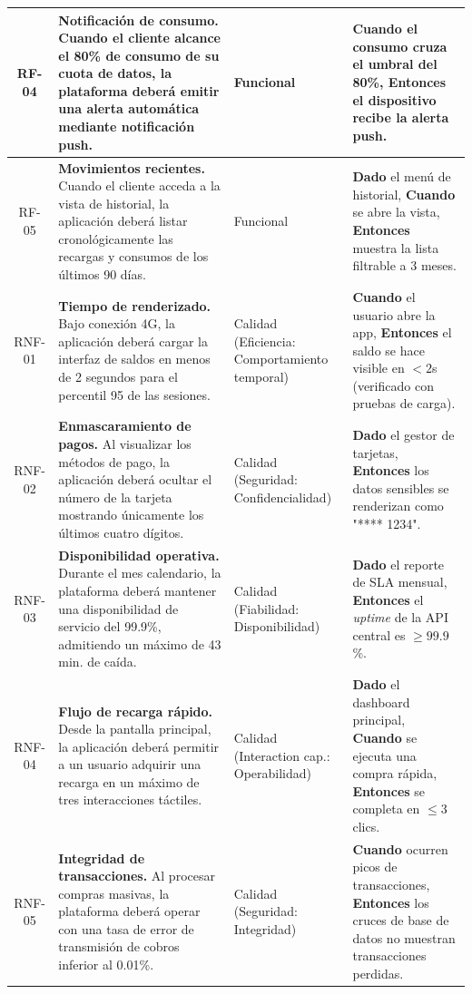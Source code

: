 \documentclass[12pt,a4paper]{article}
\begin{document}
\begin{xltabular}{\textwidth}{|c|>{\raggedright\arraybackslash}X|>{\raggedright\arraybackslash}p{3.2cm}|>{\raggedright\arraybackslash}X|}
RF-04 & \textbf{Notificación de consumo.} Cuando el cliente alcance el 80\% de consumo de su cuota de datos, la plataforma deberá emitir una alerta automática mediante notificación push. & Funcional & \textbf{Cuando} el consumo cruza el umbral del 80\%, \textbf{Entonces} el dispositivo recibe la alerta push. \\ \hline

RF-05 & \textbf{Movimientos recientes.} Cuando el cliente acceda a la vista de historial, la aplicación deberá listar cronológicamente las recargas y consumos de los últimos 90 días. & Funcional & \textbf{Dado} el menú de historial, \textbf{Cuando} se abre la vista, \textbf{Entonces} muestra la lista filtrable a 3 meses. \\ \hline

RNF-01 & \textbf{Tiempo de renderizado.} Bajo conexión 4G, la aplicación deberá cargar la interfaz de saldos en menos de 2 segundos para el percentil 95 de las sesiones. & Calidad (Eficiencia: Comportamiento temporal) & \textbf{Cuando} el usuario abre la app, \textbf{Entonces} el saldo se hace visible en $<2$s (verificado con pruebas de carga). \\ \hline

RNF-02 & \textbf{Enmascaramiento de pagos.} Al visualizar los métodos de pago, la aplicación deberá ocultar el número de la tarjeta mostrando únicamente los últimos cuatro dígitos. & Calidad (Seguridad: Confidencialidad) & \textbf{Dado} el gestor de tarjetas, \textbf{Entonces} los datos sensibles se renderizan como "**** 1234". \\ \hline

RNF-03 & \textbf{Disponibilidad operativa.} Durante el mes calendario, la plataforma deberá mantener una disponibilidad de servicio del 99.9\%, admitiendo un máximo de 43 min. de caída. & Calidad (Fiabilidad: Disponibilidad) & \textbf{Dado} el reporte de SLA mensual, \textbf{Entonces} el \textit{uptime} de la API central es $\ge99.9$\%. \\ \hline

RNF-04 & \textbf{Flujo de recarga rápido.} Desde la pantalla principal, la aplicación deberá permitir a un usuario adquirir una recarga en un máximo de tres interacciones táctiles. & Calidad (Interaction cap.: Operabilidad) & \textbf{Dado} el dashboard principal, \textbf{Cuando} se ejecuta una compra rápida, \textbf{Entonces} se completa en $\le3$ clics. \\ \hline

RNF-05 & \textbf{Integridad de transacciones.} Al procesar compras masivas, la plataforma deberá operar con una tasa de error de transmisión de cobros inferior al 0.01\%. & Calidad (Seguridad: Integridad) & \textbf{Cuando} ocurren picos de transacciones, \textbf{Entonces} los cruces de base de datos no muestran transacciones perdidas. \\ \hline


\end{xltabular}
\end{document}
